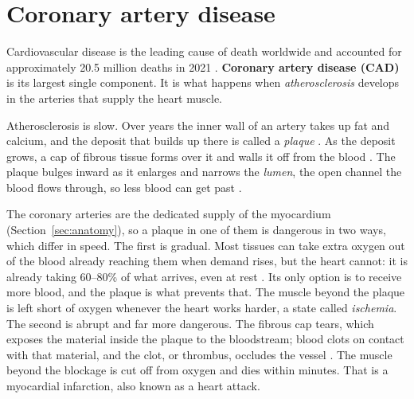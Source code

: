 %
%

\section{Coronary artery disease}
\label{sec:cad}

Cardiovascular disease is the leading cause of death worldwide and accounted for approximately
20.5 million deaths in 2021 \cite{lindstrom2022global}.
\textbf{Coronary artery disease (CAD)} is its largest single component.
It is what happens when \emph{atherosclerosis} develops in the arteries that supply the heart
muscle.

Atherosclerosis is slow.
Over years the inner wall of an artery takes up fat and calcium, and the deposit that builds up
there is called a \emph{plaque} \cite{libby2019atherosclerosis}.
As the deposit grows, a cap of fibrous tissue forms over it and walls it off from the blood
\cite{libby2019atherosclerosis}.
The plaque bulges inward as it enlarges and narrows the \emph{lumen}, the open channel the blood
flows through, so less blood can get past \cite{libby2019atherosclerosis}.

The coronary arteries are the dedicated supply of the myocardium (Section~\ref{sec:anatomy}), so a plaque in one of them is dangerous in two ways, which differ in speed. 
The first is gradual. Most tissues can take extra oxygen out of the blood already reaching them when demand rises, but
the heart cannot: it is already taking 60--80\% of what arrives, even at rest
\cite{duncker2015regulation}. Its only option is to receive more blood, and the plaque is what prevents that. The muscle beyond the plaque is left short of oxygen whenever the heart works harder, a state
called \emph{ischemia}.
The second is abrupt and far more dangerous. The fibrous cap tears, which
exposes the material inside the plaque to the bloodstream; blood clots on contact with that
material, and the clot, or thrombus, occludes the vessel \cite{rampidis2022geometry}. The muscle beyond the blockage is cut off from oxygen and dies within minutes. That is a myocardial infarction, also known as a heart attack.

